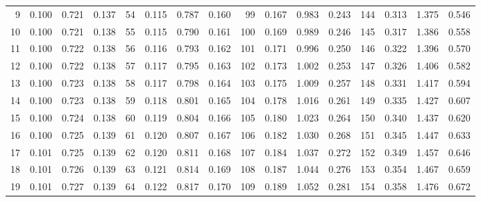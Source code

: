 \begin{table}[!h]
{\begin{tabular}{rrrr|rrrr|rrrr|crrr}
  9 & \tiny{  0.100} &   0.721 & \tiny{  0.137} &  54 & \tiny{  0.115} &   0.787 & \tiny{  0.160} &  99 & \tiny{  0.167} &   0.983 & \tiny{  0.243} & 144 & \tiny{  0.313} &   1.375 & \tiny{  0.546}\\
 10 & \tiny{  0.100} &   0.721 & \tiny{  0.138} &  55 & \tiny{  0.115} &   0.790 & \tiny{  0.161} & 100 & \tiny{  0.169} &   0.989 & \tiny{  0.246} & 145 & \tiny{  0.317} &   1.386 & \tiny{  0.558}\\
 11 & \tiny{  0.100} &   0.722 & \tiny{  0.138} &  56 & \tiny{  0.116} &   0.793 & \tiny{  0.162} & 101 & \tiny{  0.171} &   0.996 & \tiny{  0.250} & 146 & \tiny{  0.322} &   1.396 & \tiny{  0.570}\\
 12 & \tiny{  0.100} &   0.722 & \tiny{  0.138} &  57 & \tiny{  0.117} &   0.795 & \tiny{  0.163} & 102 & \tiny{  0.173} &   1.002 & \tiny{  0.253} & 147 & \tiny{  0.326} &   1.406 & \tiny{  0.582}\\
 13 & \tiny{  0.100} &   0.723 & \tiny{  0.138} &  58 & \tiny{  0.117} &   0.798 & \tiny{  0.164} & 103 & \tiny{  0.175} &   1.009 & \tiny{  0.257} & 148 & \tiny{  0.331} &   1.417 & \tiny{  0.594}\\
 14 & \tiny{  0.100} &   0.723 & \tiny{  0.138} &  59 & \tiny{  0.118} &   0.801 & \tiny{  0.165} & 104 & \tiny{  0.178} &   1.016 & \tiny{  0.261} & 149 & \tiny{  0.335} &   1.427 & \tiny{  0.607}\\
 15 & \tiny{  0.100} &   0.724 & \tiny{  0.138} &  60 & \tiny{  0.119} &   0.804 & \tiny{  0.166} & 105 & \tiny{  0.180} &   1.023 & \tiny{  0.264} & 150 & \tiny{  0.340} &   1.437 & \tiny{  0.620}\\
 16 & \tiny{  0.100} &   0.725 & \tiny{  0.139} &  61 & \tiny{  0.120} &   0.807 & \tiny{  0.167} & 106 & \tiny{  0.182} &   1.030 & \tiny{  0.268} & 151 & \tiny{  0.345} &   1.447 & \tiny{  0.633}\\
 17 & \tiny{  0.101} &   0.725 & \tiny{  0.139} &  62 & \tiny{  0.120} &   0.811 & \tiny{  0.168} & 107 & \tiny{  0.184} &   1.037 & \tiny{  0.272} & 152 & \tiny{  0.349} &   1.457 & \tiny{  0.646}\\
 18 & \tiny{  0.101} &   0.726 & \tiny{  0.139} &  63 & \tiny{  0.121} &   0.814 & \tiny{  0.169} & 108 & \tiny{  0.187} &   1.044 & \tiny{  0.276} & 153 & \tiny{  0.354} &   1.467 & \tiny{  0.659}\\
 19 & \tiny{  0.101} &   0.727 & \tiny{  0.139} &  64 & \tiny{  0.122} &   0.817 & \tiny{  0.170} & 109 & \tiny{  0.189} &   1.052 & \tiny{  0.281} & 154 & \tiny{  0.358} &   1.476 & \tiny{  0.672}\\

\end{tabular}}
\end{table}

